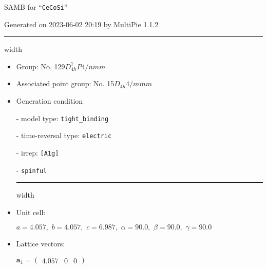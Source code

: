 \documentclass[fleqn,10pt,landscape]{article}
\begin{document}
\setcounter{MaxMatrixCols}{16}

\setlength{\baselineskip}{16pt}
\footnotesize
\begin{center}
\LARGE
SAMB for ``\texttt{CeCoSi}''
\end{center}
\begin{flushright}
Generated on 2023-06-02 20:19 by MultiPie 1.1.2
\end{flushright}
\vspace{1cm}


 \hfil \hrule height 1mm width \textwidth \hfil

\begin{itemize}
\item Group: No. 129\quad$D_{4h}^{7}$\quad$P4/nmm$\quad[ tetragonal ]

\item Associated point group: No. 15\quad$D_{4h}$\quad$4/mmm$\quad[ tetragonal ]

\vspace{5mm}

\item Generation condition

\quad - model type: \texttt{tight_binding}

\quad - time-reversal type: \texttt{electric}

\quad - irrep: \texttt{[A1g]}

\quad - \texttt{spinful}


 \hfil \hrule height 1mm width \textwidth \hfil

\item Unit cell:

\quad $a=4.057,\,\, b=4.057,\,\, c=6.987,\,\, \alpha=90.0,\,\, \beta=90.0,\,\, \gamma=90.0$

\item Lattice vectors:

\quad $\bm{a}_1=\begin{pmatrix} 4.057 & 0 & 0 \end{pmatrix}$


\end{itemize}
\end{document}

